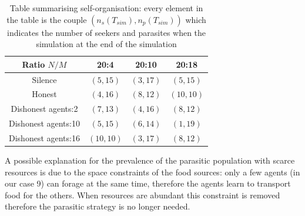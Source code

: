 \begin{table}[htbp]
\caption[Tabular results for self organisation property]{
Table summarising self-organisation:
every element in the table is the couple $(n_{s}(T_{sim}),n_{p}(T_{sim}))$
which indicates the number of seekers and parasites when the simulation
at the end of the simulation}
\label{tab:population}
\begin{center}
\small{
\begin{tabular}{@{}c|ccc@{}}
\hline
Ratio $N/M$ & 20:4 & 20:10 & 20:18\\
\hline
Silence & $(5,15)$ & $(3,17)$ & $(5,15)$\\
\hline
Honest & $(4,16)$ & $(8,12)$ & $(10,10)$\\
\hline
Dishonest agents:2  & $(7,13)$ & $(4,16)$ & $(8,12)$\\
Dishonest agents:10 & $(5,15)$ & $(6,14)$ & $(1,19)$\\
Dishonest agents:16 & $(10,10)$ & $(3,17)$ & $(8,12)$\\
\end{tabular}
}
\end{center}
\end{table}

A possible explanation for the prevalence of the parasitic population with scarce resources is due to the space constraints of the food sources: only a few agents (in our case 9) can forage at the same time, therefore the agents learn to transport food for the others. When resources are abundant this constraint is removed therefore the parasitic strategy is no longer needed.

